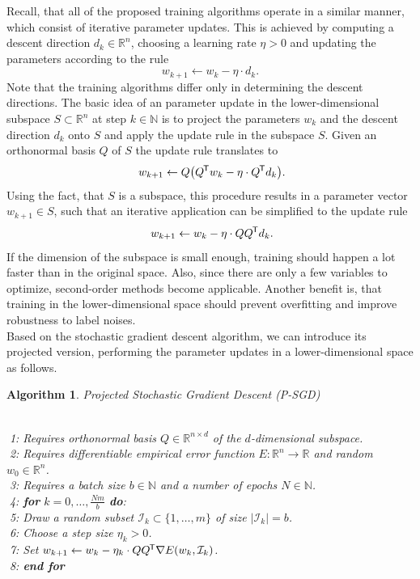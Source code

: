 \documentclass[11pt, a4paper]{article}
\newtheorem{algorithm}[theorem]{Algorithm}
\newcommand{\N}{\mathbb{N}}
\newcommand{\R}{\mathbb{R}}
\newcommand{\I}{\mathcal{I}}
\newcommand*{\tr}{^{\mkern-1.5mu\mathsf{T}}}
\begin{document}
Recall, that all of the proposed training algorithms operate in a similar manner, which consist of iterative parameter updates. This is achieved by computing a descent direction $d_k \in \R^n$, choosing a learning rate $\eta > 0$ and updating the parameters according to the rule
\[ w_{k+1} \leftarrow w_k - \eta \cdot d_k. \]
Note that the training algorithms differ only in determining the descent directions. The basic idea of an parameter update in the  lower-dimensional subspace $S \subset \R^n$ at step $k \in \N$ is to project the parameters $w_k$ and the descent direction $d_k$ onto $S$ and apply the update rule in the subspace $S$. Given an orthonormal basis $Q$ of $S$ the update rule translates to
\[ w_{k+1} \leftarrow Q \big ( Q \tr w_k - \eta \cdot Q \tr d_k \big ). \]
Using the fact, that $S$ is a subspace, this procedure results in a parameter vector $w_{k+1} \in S$, such that an iterative application can be simplified to the update rule
\[ w_{k+1} \leftarrow w_k - \eta \cdot Q Q \tr d_k. \]
If the dimension of the subspace is small enough, training should happen a lot faster than in the original space. Also, since there are only a few variables to optimize, second-order methods become applicable. Another benefit is, that training in the lower-dimensional space should prevent overfitting and improve robustness to label noises. \\

Based on the stochastic gradient descent algorithm, we can introduce its projected version, performing the parameter updates in a lower-dimensional space as follows.

\begin{algorithm}
\caption{Projected Stochastic Gradient Descent (P-SGD) \textcolor{white}{$\Big |$}} \ \\
\textcolor{white}{$\Big |$}1: Requires orthonormal basis $Q \in \R^{n \times d}$ of the $d$-dimensional subspace. \\
\textcolor{white}{$\Big |$}2: Requires differentiable empirical error function $E: \R^n \to \R$ and random $w_0 \in \R^n$. \\
\textcolor{white}{$\Big |$}3: Requires a batch size $b \in \N$ and a number of epochs $N \in \N$. \\
\textcolor{white}{$\Big |$}4: \textbf{for} $k=0, \dots, \frac{Nm}{b}$ \textbf{do}: \\
\textcolor{white}{$\Big |$}5: \quad Draw a random subset $\I_k \subset \{1, \dots, m \}$ of size $| \I_k | = b$. \\
\textcolor{white}{$\Big |$}6: \quad Choose a step size $\eta_k > 0$. \\
\textcolor{white}{$\Big |$}7: \quad Set $w_{k+1} \leftarrow  w_k - \eta_k \cdot QQ\tr \nabla E(w_k,\I_k)$. \\
\textcolor{white}{$\Big |$}8: \textbf{end for}
\end{algorithm}
\end{document}
